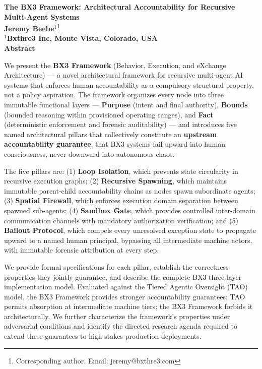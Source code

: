 \documentclass[11pt,oneside]{article}
\begin{document}
\thispagestyle{empty}
\vspace*{2cm}

\begin{center}
\textbf{\LARGE The BX3 Framework: Architectural Accountability for Recursive Multi-Agent Systems}\\[1.5em]

\textbf{Jeremy Beebe}$^{1}$\footnote{Corresponding author. Email: jeremy@bxthre3.com} \\[0.6em]
\textbf{$^{1}$Bxthre3 Inc, Monte Vista, Colorado, USA}\\[2em]

\textbf{Abstract}\\[0.5em]
\end{center}

\noindent
We present the \textbf{BX3 Framework} (Behavior, Execution, and eXchange Architecture) ---
a novel architectural framework for recursive multi-agent AI systems that enforces
human accountability as a compulsory structural property, not a policy aspiration.
The framework organizes every node into three immutable functional layers ---
\textbf{Purpose} (intent and final authority), \textbf{Bounds} (bounded reasoning within
provisioned operating ranges), and \textbf{Fact} (deterministic enforcement and forensic
auditability) --- and introduces five named architectural pillars that collectively
constitute an \textbf{upstream accountability guarantee}: that BX3 systems
fail upward into human consciousness, never downward into autonomous chaos.

The five pillars are: (1) \textbf{Loop Isolation}, which prevents state circularity
in recursive execution graphs; (2) \textbf{Recursive Spawning}, which maintains immutable
parent-child accountability chains as nodes spawn subordinate agents; (3)
\textbf{Spatial Firewall}, which enforces execution domain separation between spawned
sub-agents; (4) \textbf{Sandbox Gate}, which provides controlled inter-domain
communication channels with mandatory authorization verification; and
(5) \textbf{Bailout Protocol}, which compels every unresolved exception state to
propagate upward to a named human principal, bypassing all intermediate machine
actors, with immutable forensic attribution at every step.

We provide formal specifications for each pillar, establish the correctness
properties they jointly guarantee, and describe the complete BX3 three-layer
implementation model.  Evaluated against the Tiered Agentic Oversight (TAO) model,
the BX3 Framework provides stronger accountability guarantees: TAO permits
absorption at intermediate machine tiers; the BX3 Framework forbids it
architecturally.  We further characterize the framework's properties under
adversarial conditions and identify the directed research agenda required to
extend these guarantees to high-stakes production deployments.
\end{document}

